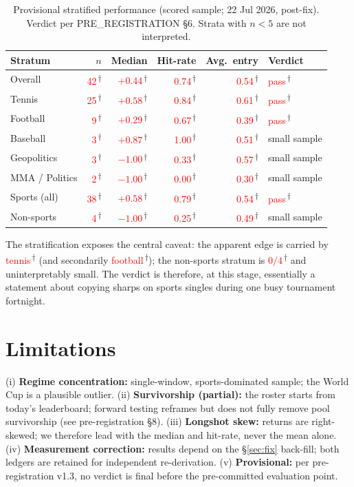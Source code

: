 \documentclass[11pt]{article}
\newcommand{\prov}[1]{\textcolor{red}{#1}\textsuperscript{\,$\dagger$}}
\begin{document}
\begin{table}[h]
\centering
\caption{Provisional stratified performance (scored sample; 22 Jul 2026, post-fix).
Verdict per PRE\_REGISTRATION \S6. Strata with $n<5$ are not interpreted.}
\label{tab:strata}
\begin{tabular}{lrrrrl}
\toprule
Stratum & $n$ & Median & Hit-rate & Avg.\ entry & Verdict \\
\midrule
Overall            & \prov{42} & \prov{$+0.44$} & \prov{0.74} & \prov{0.54} & \prov{pass} \\
\midrule
Tennis             & \prov{25} & \prov{$+0.58$} & \prov{0.84} & \prov{0.61} & \prov{pass} \\
Football           & \prov{9}  & \prov{$+0.29$} & \prov{0.67} & \prov{0.39} & \prov{pass} \\
Baseball           & \prov{3}  & \prov{$+0.87$} & \prov{1.00} & \prov{0.51} & small sample \\
Geopolitics        & \prov{3}  & \prov{$-1.00$} & \prov{0.33} & \prov{0.57} & small sample \\
MMA / Politics     & \prov{2}  & \prov{$-1.00$} & \prov{0.00} & \prov{0.30} & small sample \\
\midrule
Sports (all)       & \prov{38} & \prov{$+0.58$} & \prov{0.79} & \prov{0.54} & \prov{pass} \\
Non-sports         & \prov{4}  & \prov{$-1.00$} & \prov{0.25} & \prov{0.49} & small sample \\
\bottomrule
\end{tabular}
\end{table}

The stratification exposes the central caveat: the apparent edge is carried by
\prov{tennis} (and secondarily \prov{football}); the non-sports stratum is
\prov{$0/4$} and uninterpretably small. The verdict is therefore, at this stage,
essentially a statement about copying sharps on sports singles during one busy
tournament fortnight.

\section{Limitations}
(i) \textbf{Regime concentration:} single-window, sports-dominated sample;
the World Cup is a plausible outlier. (ii) \textbf{Survivorship (partial):} the
roster starts from today's leaderboard; forward testing reframes but does not
fully remove pool survivorship (see pre-registration \S8). (iii)
\textbf{Longshot skew:} returns are right-skewed; we therefore lead with the
median and hit-rate, never the mean alone. (iv) \textbf{Measurement correction:}
results depend on the \S\ref{sec:fix} back-fill; both ledgers are retained for
independent re-derivation. (v) \textbf{Provisional:} per pre-registration v1.3,
no verdict is final before the pre-committed evaluation point.
\end{document}
